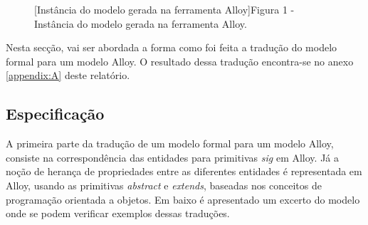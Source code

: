\documentclass{article}
\begin{document}
\begin{figure}[H]
    \begin{centering}
         \centerline{}
         [Instância do modelo gerada na ferramenta Alloy]{Figura 1 - Instância do modelo gerada na ferramenta Alloy.}
    \end{centering}
\end{figure}

\par Nesta secção, vai ser abordada a forma como foi feita a tradução do modelo formal para um modelo Alloy. O resultado dessa tradução encontra-se no anexo \ref{appendix:A} deste relatório.


\subsection{Especificação}

\par A primeira parte da tradução de um modelo formal para um modelo Alloy, consiste na correspondência das entidades para primitivas \emph{sig} em Alloy. Já a noção de herança de propriedades entre as diferentes entidades é representada em Alloy, usando as primitivas \emph{abstract} e \emph{extends}, baseadas nos conceitos de programação orientada a objetos. Em baixo é apresentado um excerto do modelo onde se podem verificar exemplos dessas traduções.
\end{document}

